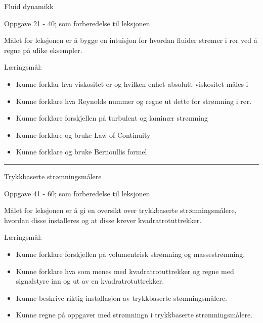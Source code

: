 \vskip 2pt  Fluid dynamikk

\vskip 2pt \noindent Oppgave 21 - 40;  som forberedelse til leksjonen%

\vskip 10pt

	Målet for leksjonen er å bygge en intuisjon for hvordan fluider strømer i rør ved å regne på ulike eksempler. 

	Læringsmål:
	\begin{itemize}[noitemsep]
		\item Kunne forklar hva viskositet er og hvilken enhet absolutt viskositet måles i 
		\item Kunne forklare hva Reynolds nummer og regne ut dette for strømning i rør.
		\item Kunne forklare forskjellen på turbulent og laminær strømning
		\item Kunne forklare og bruke Law of Continuity 
		\item Kunne forklare og bruke Bernoullis formel
	\end{itemize}


\filbreak
\hrule \vskip 5pt
\noindent {}

\vskip 5pt


\vskip 2pt  Trykkbaserte strømningsmålere

\vskip 2pt \noindent Oppgave 41 - 60;  som forberedelse til leksjonen%

\vskip 10pt


	Målet for leksjonen er å gi en oversikt over trykkbaserte strømningsmålere, hvordan disse installeres og at disse krever kvadratrotuttrekker. 

	Læringsmål:
	\begin{itemize}[noitemsep]
		\item Kunne forklare forskjellen på volumentrisk strømning og massestrømning.
		\item Kunne forklare hva som menes med kvadratrotuttrekker og regne med signalstyre inn og ut av en kvadratrotuttrekker.
		\item Kunne beskrive riktig installasjon av trykkbaserte stømningsmålere.
		\item Kunne regne på oppgaver med strømningn i trykkbaserte strømningsmålere. 
	\end{itemize}


